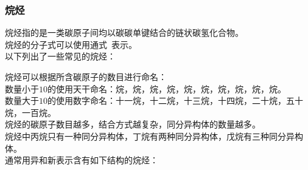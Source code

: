 \documentclass[UTF8]{ctexart}
\begin{document}
\subsubsection{烷烃}
    烷烃指的是一类碳原子间均以碳碳单键结合的链状碳氢化合物。\\[3mm]
    烷烃的分子式可以使用通式~表示。\\[4mm]
    以下列出了一些常见的烷烃：\vspace{5pt}
    \begin{center}
        \qquad
        \qquad
    \end{center}\vspace{10pt}
    烷烃可以根据所含碳原子的数目进行命名：\\[3mm]
    数量小于$10$的使用天干命名：烷，烷，烷，烷，烷，烷，烷，烷，烷，烷。\\[3mm]
    数量大于$10$的使用数字命名：十一烷，十二烷，十三烷，十四烷，二十烷，五十烷，一百烷。\\[6mm]
    烷烃的碳原子数目越多，结合方式越复杂，同分异构体的数量越多。\\[3mm]
    烷烃中丙烷只有一种同分异构体，丁烷有两种同分异构体，戊烷有三种同分异构体。\\[6mm]
    通常用异和新表示含有如下结构的烷烃：\vspace{5pt}
    \begin{center}

        \qquad\qquad
    \end{center}\vspace{15pt}
\end{document}
